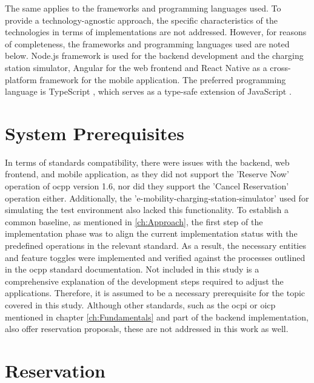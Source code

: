 The same applies to the frameworks and programming languages used. To provide a technology-agnostic approach, the specific characteristics of the technologies in terms of implementations are not addressed.
However, for reasons of completeness, the frameworks and programming languages used are noted below. Node.js framework \cite{noauthor_nodejs_nodate} is used for the backend development and the charging station simulator, Angular \cite{noauthor_angular_nodate} for the web frontend and React Native \cite{noauthor_react_nodate} as a cross-platform framework for the mobile application. The preferred programming language is TypeScript \cite{noauthor_javascript_nodate}, which serves as a type-safe extension of JavaScript \cite{noauthor_javascript_2023}.

\section{System Prerequisites}
\label{ch:Implementation:sec:System Prerequisites}

In terms of standards compatibility, there were issues with the backend, web frontend, and mobile application, as they did not support the 'Reserve Now' operation of \acrshort{ocpp} version 1.6, nor did they support the 'Cancel Reservation' operation either.
Additionally, the 'e-mobility-charging-station-simulator' \cite{noauthor_julianhbuechere-mobility-charging-stations-simulator_nodate} used for simulating the test environment also lacked this functionality.
To establish a common baseline, as mentioned in \ref{ch:Approach}, the first step of the implementation phase was to align the current implementation status with the predefined operations in the relevant standard.
As a result, the necessary entities and feature toggles were implemented and verified against the processes outlined in the \acrfull{ocpp} standard documentation.
Not included in this study is a comprehensive explanation of the development steps required to adjust the applications. Therefore, it is assumed to be a necessary prerequisite for the topic covered in this study.
Although other standards, such as the \acrshort{ocpi} or \acrshort{oicp} mentioned in chapter \ref{ch:Fundamentals} and part of the backend implementation, also offer reservation proposals, these are not addressed in this work as well.

\section{Reservation}
\label{ch:Implementation:sec:Reservation}

